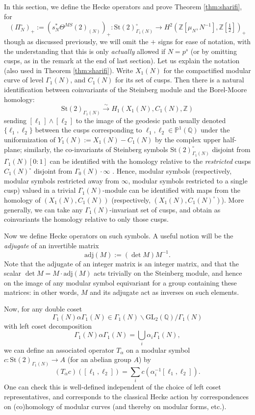 \documentclass[10pt]{amsart}
\theoremstyle{definition}
\newcommand{\Z}{\mathbb{Z}}
\newcommand{\Q}{\mathbb{Q}}
\newcommand{\St}{\mathrm{St}}
\renewcommand{\P}{\mathbb{P}}
\newcommand{\GL}{\mathrm{GL}}
\numberwithin{equation}{section}
\begin{document}
    In this section, we define the Hecke operators and prove Theorem \ref{thm:sharifi}, for 
    \[
        (\Pi^\circ_N)_+ := (s_N^*\Theta^{MS}(2)_{(N)})_+: \St(2)^\circ_{\Gamma_1(N)} \to H^2(\Z[\mu_N,N^{-1}], \Z[\tfrac{1}{2}])_+
    \]
    though as discussed previously, we will omit the $+$ signs for ease of notation, with the understanding that this is only \emph{actually} allowed if $N=p^s$ (or by omitting cusps, as in the remark at the end of last section). Let us explain the notation (also used in Theorem \ref{thm:sharifi}). Write $X_1(N)$ for the compactified modular curve of level $\Gamma_1(N)$, and $C_1(N)$ for its set of cusps. Then there is a natural identification between coinvariants of the Steinberg module and the Borel-Moore homology:
    \[
    \St(2)_{\Gamma_1(N)} \xrightarrow{\sim} H_1(X_1(N), C_1(N), \Z)
    \]
    sending $[\ell_1]\wedge [\ell_2]$ to the image of the geodesic path usually denoted $\{\ell_1,\ell_2\}$ between the cusps corresponding to $\ell_1,\ell_2\in \P^1(\Q)$ under the uniformization of $Y_1(N):=X_1(N)-C_1(N)$ by the complex upper half-plane; similarly, the co-invariants of Steinberg symbols $\St(2)^\circ_{\Gamma_1(N)}$ disjoint from $\Gamma_1(N)[0:1]$ can be identified with the homology relative to the \emph{restricted} cusps $C_1(N)^\circ$ disjoint from $\Gamma_0(N)\cdot \infty$ \cite{AR}. Hence, modular symbols (respectively, modular symbols restricted away from $\infty$, modular symbols restricted to a single cusp) valued in a trivial $\Gamma_1(N)$-module can be identified with maps from the homology of $(X_1(N),C_1(N))$ (respectively, $(X_1(N),C_1(N)^\circ)$). More generally, we can take any $\Gamma_1(N)$-invariant set of cusps, and obtain as coinvariants the homology relative to only those cusps.

    Now we define Hecke operators on such symbols. A useful notion will be the \emph{adjugate} of an invertible matrix
    \[
    \mathrm{adj}(M) := (\det M)M^{-1}.
    \]
    Note that the adjugate of an integer matrix is an integer matrix, and that the scalar $\det M = M\cdot \mathrm{adj}(M)$ acts trivially on the Steinberg module, and hence on the image of any modular symbol equivariant for a group containing these matrices: in other words, $M$ and its adjugate act as inverses on such elements.
    
    Now, for any double coset 
    \[
    \Gamma_1(N)\alpha \Gamma_1(N) \in \Gamma_1(N)\backslash \GL_2(\Q)/\Gamma_1(N)
    \]
    with left coset decomposition
    \[
    \Gamma_1(N)\alpha \Gamma_1(N) = \bigcup_i \alpha_i \Gamma_1(N),
    \]
    we can define an associated operator $T_\alpha$ on a modular symbol $c: \St(2)_{\Gamma_1(N)} \to A$ (for an abelian group $A$) by
    \[
        (T_\alpha c)([\ell_1,\ell_2]) = \sum_i c(\alpha_i^{-1} [\ell_1,\ell_2]).
    \]
    One can check this is well-defined independent of the choice of left coset representatives, and corresponds to the classical Hecke action by correspondences on (co)homology of modular curves (and thereby on modular forms, etc.).
\end{document}
